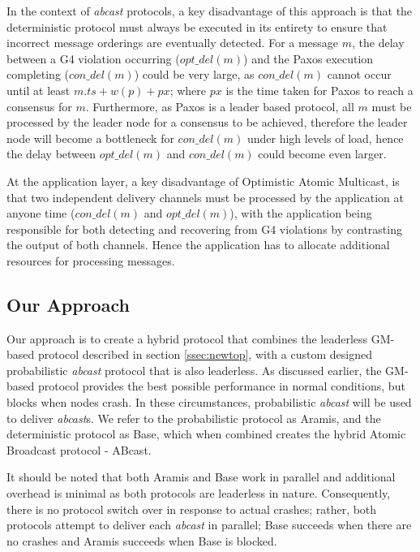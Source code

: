     In the context of \emph{abcast} protocols, a key disadvantage of this approach is that the deterministic protocol must always be executed in its entirety to ensure that incorrect message orderings are eventually detected.  For a message $m$, the delay between a G4 violation occurring ($opt\_del(m)$) and the Paxos execution completing ($con\_del(m)$) could be very large, as $con\_del(m)$ cannot occur until at least $m.ts + w(p) + px$; where $px$ is the time taken for Paxos to reach a consensus for $m$.   Furthermore, as Paxos is a leader based protocol, all $m$ must be processed by the leader node for a consensus to be achieved, therefore the leader node will become a bottleneck for $con\_del(m)$ under high levels of load, hence the delay between $opt\_del(m)$ and $con\_del(m)$ could become even larger.      
    
    At the application layer, a key disadvantage of Optimistic Atomic Multicast, is that two independent delivery channels must be processed by the application at anyone time ($con\_del(m)$ and $opt\_del(m)$), with the application being responsible for both detecting and recovering from G4 violations by contrasting the output of both channels.  Hence the application has to allocate additional resources for processing messages.  
    
    \subsection{Our Approach}
    Our approach is to create a hybrid protocol that combines the leaderless GM-based protocol described in section \ref{ssec:newtop}, with a custom designed probabilistic \emph{abcast} protocol that is also leaderless.  As discussed earlier, the GM-based protocol provides the best possible performance in normal conditions, but blocks when nodes crash.  In these circumstances, probabilistic \emph{abcast} will be used to deliver \emph{abcast}s. We refer to the probabilistic protocol as \textsf{Aramis}, and the deterministic protocol as \textsf{Base}, which when combined creates the hybrid Atomic Broadcast protocol - \textsf{ABcast}.  
    
    It should be noted that both \textsf{Aramis} and \textsf{Base} work in parallel and additional overhead is minimal as both protocols are leaderless in nature.  Consequently, there is no protocol switch over in response to actual crashes; rather, both protocols attempt to deliver each \emph{abcast} in parallel; \textsf{Base} succeeds when there are no crashes and \textsf{Aramis} succeeds when \textsf{Base} is blocked.  
    
